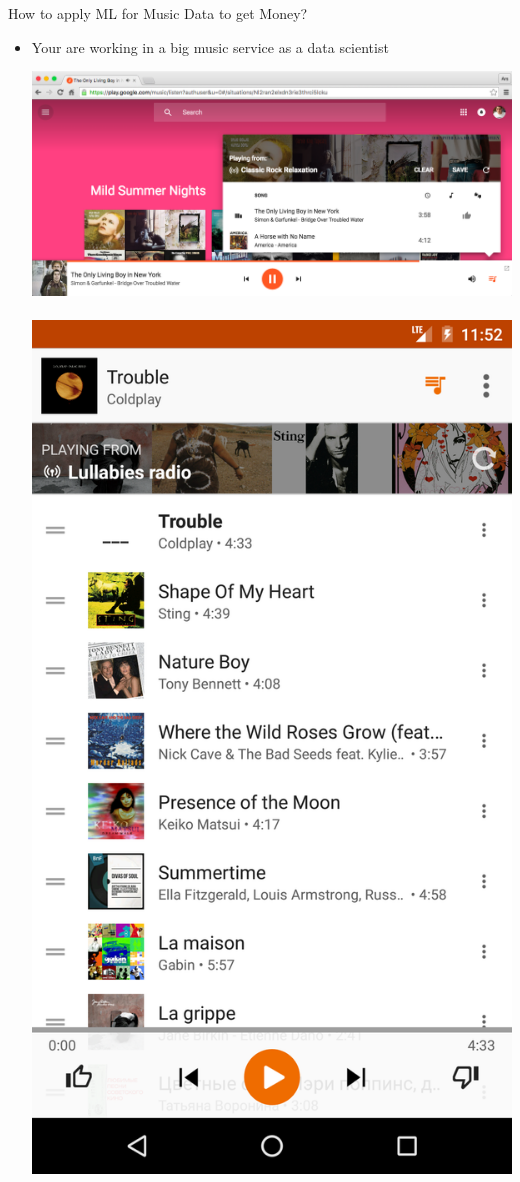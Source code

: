\documentclass{beamer}
\begin{document}
\begin{frame}{How to apply ML for Music Data to get Money?} 
	\begin{itemize}
		 \item  Your are working in a big music service as a data scientist
		\begin{center}		  
			 \includegraphics[scale=0.15]{img/interface}~~~  \includegraphics[scale=0.044]{img/phone}

\end{center}
\end{itemize}
\end{frame}
\end{document}
